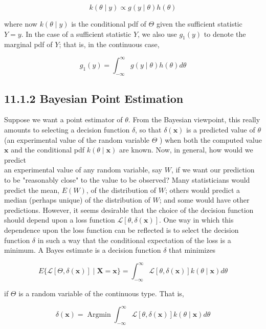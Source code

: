 \begin{equation*}
k(\theta \mid y) \propto g(y \mid \theta) h(\theta) \tag{11.1.9}
\end{equation*}


where now $k(\theta \mid y)$ is the conditional pdf of $\Theta$ given the sufficient statistic $Y=y$. In the case of a sufficient statistic $Y$, we also use $g_{1}(y)$ to denote the marginal pdf of $Y$; that is, in the continuous case,

$$
g_{1}(y)=\int_{-\infty}^{\infty} g(y \mid \theta) h(\theta) d \theta
$$

\subsection*{11.1.2 Bayesian Point Estimation}
Suppose we want a point estimator of $\theta$. From the Bayesian viewpoint, this really amounts to selecting a decision function $\delta$, so that $\delta(\mathbf{x})$ is a predicted value of $\theta$ (an experimental value of the random variable $\Theta$ ) when both the computed value $\mathbf{x}$ and the conditional pdf $k(\theta \mid \mathbf{x})$ are known. Now, in general, how would we predict\\
an experimental value of any random variable, say $W$, if we want our prediction to be "reasonably close" to the value to be observed? Many statisticians would predict the mean, $E(W)$, of the distribution of $W$; others would predict a median (perhaps unique) of the distribution of $W$; and some would have other predictions. However, it seems desirable that the choice of the decision function should depend upon a loss function $\mathcal{L}[\theta, \delta(\mathbf{x})]$. One way in which this dependence upon the loss function can be reflected is to select the decision function $\delta$ in such a way that the conditional expectation of the loss is a minimum. A Bayes estimate is a decision function $\delta$ that minimizes

$$
E\{\mathcal{L}[\Theta, \delta(\mathbf{x})] \mid \mathbf{X}=\mathbf{x}\}=\int_{-\infty}^{\infty} \mathcal{L}[\theta, \delta(\mathbf{x})] k(\theta \mid \mathbf{x}) d \theta
$$

if $\Theta$ is a random variable of the continuous type. That is,


\begin{equation*}
\delta(\mathbf{x})=\operatorname{Argmin} \int_{-\infty}^{\infty} \mathcal{L}[\theta, \delta(\mathbf{x})] k(\theta \mid \mathbf{x}) d \theta \tag{11.1.10}
\end{equation*}


